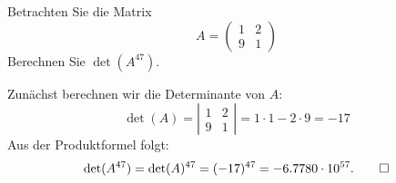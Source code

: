 Betrachten Sie die Matrix
\[
A=\begin{pmatrix}
1&2\\
9&1
\end{pmatrix}
\]
Berechnen Sie $\det(A^{47})$.

\begin{loesung}
Zunächst berechnen wir die Determinante von $A$:
\[
\det(A)=
\left|
\begin{matrix}
1&2\\
9&1
\end{matrix}
\right|
=1\cdot 1 - 2 \cdot 9 = -17
\]
Aus der Produktformel folgt:
\[
\det(A^{47})
=
\det(A)^{47}
=
(-17)^{47}
=
-6.7780\cdot 10^{57}.
\qedhere
\]
\end{loesung}




